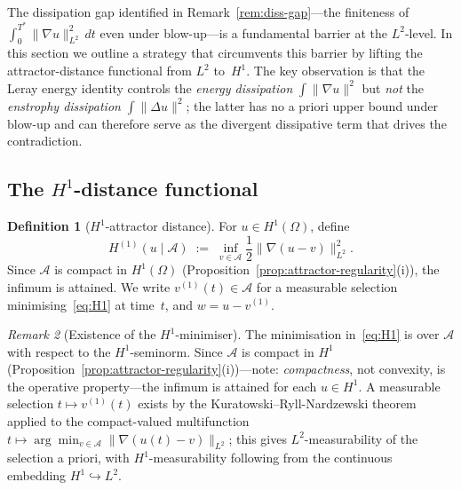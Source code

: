 \documentclass[12pt,a4paper]{article}
\theoremstyle{definition}
\newtheorem{definition}{Definition}[section]
\theoremstyle{plain}
\theoremstyle{remark}
\newtheorem{remark}[definition]{Remark}
\begin{document}
The dissipation gap identified in Remark~\ref{rem:diss-gap}---the
finiteness of $\int_0^{T^*}\|\nabla u\|_{L^2}^2\,dt$ even under
blow-up---is a fundamental barrier at the $L^2$-level.  In this
section we outline a strategy that circumvents this barrier by
lifting the attractor-distance functional from $L^2$ to~$H^1$.
The key observation is that the Leray energy identity controls the
\emph{energy dissipation} $\int\|\nabla u\|^2$ but \emph{not} the
\emph{enstrophy dissipation} $\int\|\Delta u\|^2$; the latter has
no a priori upper bound under blow-up and can therefore serve as the
divergent dissipative term that drives the contradiction.

\subsection{The \texorpdfstring{$H^1$}{H1}-distance functional}

\begin{definition}[$H^1$-attractor distance]\label{def:H1}
For $u \in H^1(\Omega)$, define
\begin{equation}\label{eq:H1}
  H^{(1)}\!(u \mid \mathcal{A})
  \;:=\;
  \inf_{v \in \mathcal{A}}
  \frac{1}{2}\|\nabla(u - v)\|_{L^2}^2.
\end{equation}
Since $\mathcal{A}$ is compact in $H^1(\Omega)$
(Proposition~\ref{prop:attractor-regularity}(i)), the infimum
is attained.  We write $v^{(1)}(t) \in \mathcal{A}$ for a
measurable selection minimising~\eqref{eq:H1} at time~$t$,
and $w = u - v^{(1)}$.
\end{definition}

\begin{remark}[Existence of the $H^1$-minimiser]
The minimisation in~\eqref{eq:H1} is over $\mathcal{A}$ with
respect to the $H^1$-seminorm.  Since $\mathcal{A}$ is compact
in $H^1$ (Proposition~\ref{prop:attractor-regularity}(i))---note:
\emph{compactness}, not convexity, is the operative
property---the infimum is attained for each $u \in H^1$.
A measurable selection $t \mapsto v^{(1)}(t)$ exists by the
Kuratowski--Ryll-Nardzewski theorem applied to the compact-valued
multifunction $t \mapsto \arg\min_{v \in \mathcal{A}}
\|\nabla(u(t)-v)\|_{L^2}$; this gives $L^2$-measurability
of the selection a priori, with $H^1$-measurability following
from the continuous embedding $H^1 \hookrightarrow L^2$.
\end{remark}
\end{document}
